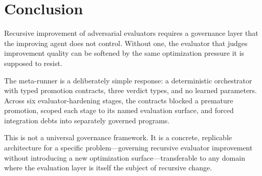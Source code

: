 \documentclass[11pt]{article}
\begin{document}
\section{Conclusion}

Recursive improvement of adversarial evaluators requires a governance layer that the improving agent does not control. Without one, the evaluator that judges improvement quality can be softened by the same optimization pressure it is supposed to resist.

The meta-runner is a deliberately simple response: a deterministic orchestrator with typed promotion contracts, three verdict types, and no learned parameters. Across six evaluator-hardening stages, the contracts blocked a premature promotion, scoped each stage to its named evaluation surface, and forced integration debts into separately governed programs.

This is not a universal governance framework. It is a concrete, replicable architecture for a specific problem---governing recursive evaluator improvement without introducing a new optimization surface---transferable to any domain where the evaluation layer is itself the subject of recursive change.




\end{document}
